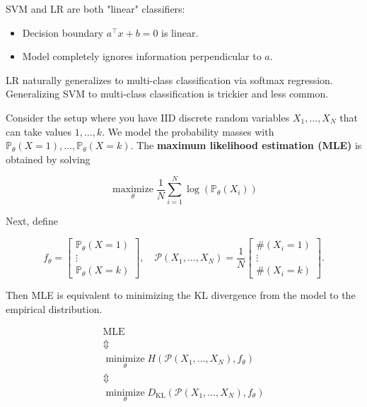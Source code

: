 \begin{concept}[3.15][SVM vs LR]
    SVM and LR are both "linear" classifiers:

    \begin{itemize}
        \item Decision boundary $a^{\top} x+b=0$ is linear.
        \item Model completely ignores information perpendicular to $a$.
    \end{itemize}

    LR naturally generalizes to multi-class classification via softmax regression. Generalizing SVM to multi-class classification is trickier and less common.
\end{concept}

\begin{concept}
    Consider the setup where you have IID discrete random variables $X_{1}, \ldots, X_{N}$ that can take values $1, \ldots, k$. We model the probability masses with $\mathbb{P}_{\theta}(X=1), \ldots, \mathbb{P}_{\theta}(X=k)$. The \textbf{maximum likelihood estimation (MLE)} is obtained by solving

    $$
    \underset{\theta}{\operatorname{maximize}} \frac{1}{N} \sum_{i=1}^{N} \log \left(\mathbb{P}_{\theta}\left(X_{i}\right)\right)
    $$

    Next, define

    $$
    f_{\theta}=\left[\begin{array}{c}
    \mathbb{P}_{\theta}(X=1) \\
    \vdots \\
    \mathbb{P}_{\theta}(X=k)
    \end{array}\right], \quad \mathcal{P}\left(X_{1}, \ldots, X_{N}\right)=\frac{1}{N}\left[\begin{array}{c}
    \#\left(X_{i}=1\right) \\
    \vdots \\
    \#\left(X_{i}=k\right)
    \end{array}\right] .
    $$

    Then MLE is equivalent to minimizing the KL divergence from the model to the empirical distribution.

    $$
    \begin{gathered}
    \text{MLE} \\
    \mathbb{\Updownarrow} \\
    \underset{\theta}{\operatorname{minimize}} H \left( \mathcal{P}\left(X_{1}, \ldots, X_{N}\right), f_{\theta}\right) \\
    \mathbb{\Updownarrow} \\
    \underset{\theta}{\operatorname{minimize}} D_{\mathrm{KL}} \left( \mathcal{P}\left(X_{1}, \ldots, X_{N}\right), f_{\theta}\right) \\
    \end{gathered}
    $$


\end{concept}
